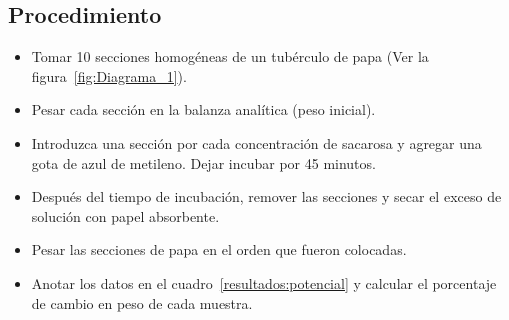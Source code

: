 \subsection{Procedimiento}

\begin{itemize}
	\item Tomar 10 secciones homog\'eneas de un tub\'erculo de papa (Ver la figura~\ref{fig:Diagrama_1}).
	\item Pesar cada secci\'on en la balanza anal\'itica (peso inicial).
	\item Introduzca una secci\'on por cada concentraci\'on de sacarosa y agregar una gota de azul de metileno. Dejar incubar por 45 minutos.
	\item Despu\'es del tiempo de incubaci\'on, remover las secciones y secar el exceso de soluci\'on con papel absorbente.
	\item Pesar las secciones de papa en el orden que fueron colocadas.
	\item Anotar los datos en el cuadro~\ref{resultados:potencial} y calcular el porcentaje de cambio en peso de cada muestra. 
\end{itemize}

